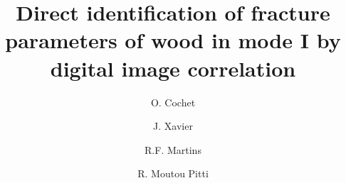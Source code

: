 \documentclass[3p,times,procedia]{elsarticle}
\begin{document}
\begin{frontmatter}



%

\title{Direct identification of fracture parameters of wood in mode I by digital image correlation}


\author[a]{O. Cochet}
\author[b,c]{J. Xavier}
\author[b,c]{R.F. Martins}
\author[a]{R. Moutou Pitti}


\address[a]{Université Clermont Auvergne, Clermont Auvergne INP, Institut Pascal, Clermont-Ferrand, France}
\address[b]{UNIDEMI, Department of Mechanical and Industrial Engineering, NOVA School of Science and Technology, Universidade NOVA de Lisboa, 2829-516 Caparica, Portugal}
\address[c]{Laboratório Associado de Sistemas Inteligentes, LASI, 4800-058 Guimarães, Portugal}



\end{frontmatter}
\end{document}
